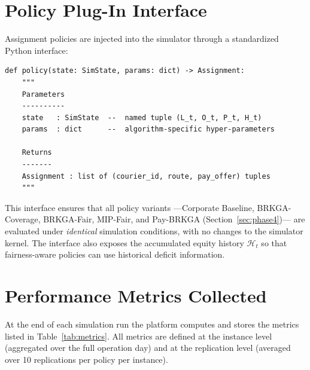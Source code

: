 \documentclass[12pt,a4paper]{report}
\begin{document}
\section{Policy Plug-In Interface}

Assignment policies are injected into the simulator through a standardized Python interface:

\begin{verbatim}
def policy(state: SimState, params: dict) -> Assignment:
    """
    Parameters
    ----------
    state   : SimState  --  named tuple (L_t, O_t, P_t, H_t)
    params  : dict      --  algorithm-specific hyper-parameters

    Returns
    -------
    Assignment : list of (courier_id, route, pay_offer) tuples
    """
\end{verbatim}

\noindent This interface ensures that all policy variants ---Corporate Baseline, BRKGA-Coverage, BRKGA-Fair, MIP-Fair, and Pay-BRKGA (Section~\ref{sec:phase4})--- are evaluated under \emph{identical} simulation conditions, with no changes to the simulator kernel. The interface also exposes the accumulated equity history $\mathcal{H}_t$ so that fairness-aware policies can use historical deficit information.

\section{Performance Metrics Collected}
\label{sec:validation}

At the end of each simulation run the platform computes and stores the metrics listed in Table~\ref{tab:metrics}. All metrics are defined at the instance level (aggregated over the full operation day) and at the replication level (averaged over 10 replications per policy per instance).
\end{document}
